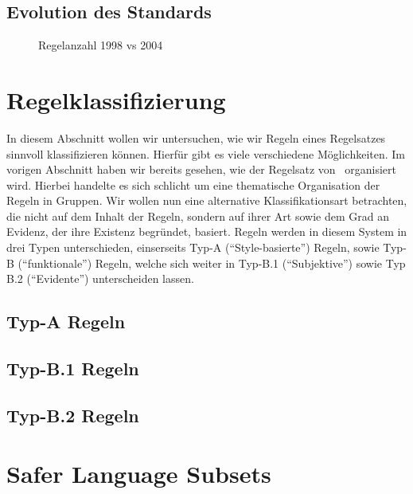 \documentclass[a4paper,UKenglish,cleveref, autoref]{templates/lipics-v2019}
\begin{document}
    \subsection{Evolution des Standards}
    \label{subsec:evolution-des-standards}

    \begin{figure}[H]
        \centering
        \captionsetup{justification=centering,margin=2cm}
        
        \caption{Regelanzahl 1998 vs 2004}
    \end{figure}

    \section{Regelklassifizierung}
    \label{sec:regelklassifizierung}
    In diesem Abschnitt wollen wir untersuchen, wie wir Regeln eines Regelsatzes sinnvoll klassifizieren können.
    Hierfür gibt es viele verschiedene Möglichkeiten.
    Im vorigen Abschnitt haben wir bereits gesehen, wie der Regelsatz von \misra\ organisiert wird.
    Hierbei handelte es sich schlicht um eine thematische Organisation der Regeln in Gruppen.
    Wir wollen nun eine alternative Klassifikationsart betrachten, die nicht auf dem Inhalt der Regeln, sondern auf ihrer
    Art sowie dem Grad an Evidenz, der ihre Existenz begründet, basiert.
    Regeln werden in diesem System in drei Typen unterschieden, einserseits Typ-A (\enquote{Style-basierte}) Regeln,
    sowie Typ-B (\enquote{funktionale}) Regeln, welche sich weiter in Typ-B.1 (\enquote{Subjektive}) sowie
    Typ B.2 (\enquote{Evidente}) unterscheiden lassen.\cite{hatton2004safer}

    \subsection{Typ-A Regeln}
    \label{subsec:typ-a-regeln}

    \subsection{Typ-B.1 Regeln}
    \label{subsec:typ-b-1-regeln}

    \subsection{Typ-B.2 Regeln}
    \label{subsec:typ-b-2-regeln}

    \section{Safer Language Subsets}
    \label{sec:safer-language-subsets}
\end{document}
